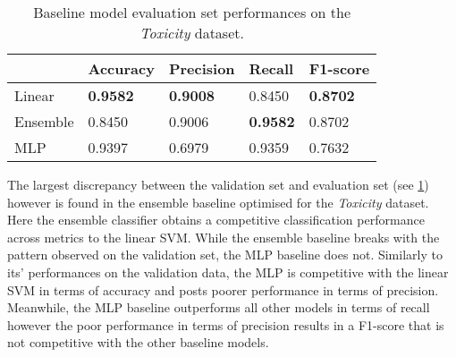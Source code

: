 \begin{table}[h]
  \centering
  \begin{tabular}{l|llll}
                          & Accuracy        & Precision       & Recall          & F1-score        \\\hline
    Linear                & \textbf{0.9582} & \textbf{0.9008} & 0.8450          & \textbf{0.8702} \\
    Ensemble\footnotemark & 0.8450          & 0.9006          & \textbf{0.9582} & 0.8702          \\
    MLP                   & 0.9397          & 0.6979          & 0.9359          & 0.7632
  \end{tabular}
  \caption{Baseline model evaluation set performances on the \textit{Toxicity} dataset.}
  \label{tab:baseline_test_wulczyn}
\end{table}

The largest discrepancy between the validation set and evaluation set (see \cref{tab:baseline_test_wulczyn}) however is found in the ensemble baseline optimised for the \textit{Toxicity} dataset.
Here the ensemble classifier obtains a competitive classification performance across metrics to the linear SVM.
While the ensemble baseline breaks with the pattern observed on the validation set, the MLP baseline does not.
Similarly to its' performances on the validation data, the MLP is competitive with the linear SVM in terms of accuracy and posts poorer performance in terms of precision.
Meanwhile, the MLP baseline outperforms all other models in terms of recall however the poor performance in terms of precision results in a F1-score that is not competitive with the other baseline models.

